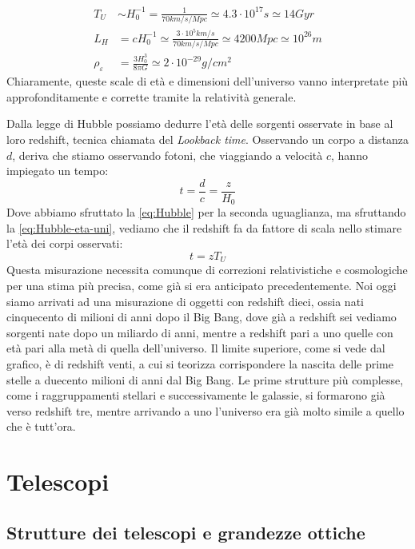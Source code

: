 \documentclass[a4paper,twoside,openany,notitlepage]{book}
\newcommand{\e}[1]{\cdot 10^{#1}}
\theoremstyle{definition}
\theoremstyle{plain}
\begin{document}
\begin{align}
	\label{eq:Hubble-eta-uni}
	T_U   & \sim H_0^{-1} = \frac{1}{70km/s/Mpc} \simeq 4.3\e{17}s \simeq 14Gyr \\
	\label{eq:Hubble-grand-uni}
	L_H   & = cH_0^{-1} \simeq \frac{3\e{5}km/s}{70km/s/Mpc} \simeq 4200Mpc \simeq 10^{26}m \\
	\label{eq:Hubble-dens-uni}
	\rho_\varepsilon   & = \frac{3H_0^3}{8\pi G} \simeq 2\e{-29}g/cm^2
\end{align}
Chiaramente, queste scale di età e dimensioni dell'universo vanno interpretate più approfonditamente e corrette tramite la relatività generale.

Dalla legge di Hubble possiamo dedurre l'età delle sorgenti osservate in base al loro redshift, tecnica chiamata del \textit{Lookback time}. Osservando un corpo a distanza $d$, deriva che stiamo osservando fotoni, che viaggiando a velocità $c$, hanno impiegato un tempo:
\begin{equation*}
	t=\frac{d}{c}=\frac{z}{H_0}
\end{equation*}
Dove abbiamo sfruttato la \ref{eq:Hubble} per la seconda uguaglianza, ma sfruttando la \ref{eq:Hubble-eta-uni}, vediamo che il redshift fa da fattore di scala nello stimare l'età dei corpi osservati:
\begin{equation*}
	t=zT_U
\end{equation*}
Questa misurazione necessita comunque di correzioni relativistiche e cosmologiche per una stima più precisa, come già si era anticipato precedentemente. Noi oggi siamo arrivati ad una misurazione di oggetti con redshift dieci, ossia nati cinquecento di milioni di anni dopo il Big Bang, dove già a redshift sei vediamo sorgenti nate dopo un miliardo di anni, mentre a redshift pari a uno quelle con età pari alla metà di quella dell'universo. Il limite superiore, come si vede dal grafico, è di redshift venti, a cui si teorizza corrispondere la nascita delle prime stelle a duecento milioni di anni dal Big Bang. Le prime strutture più complesse, come i raggruppamenti stellari e successivamente le galassie, si formarono già verso redshift tre, mentre arrivando a uno l'universo era già molto simile a quello che è tutt'ora.

\chapter{Telescopi}

\section{Strutture dei telescopi e grandezze ottiche}
\end{document}
